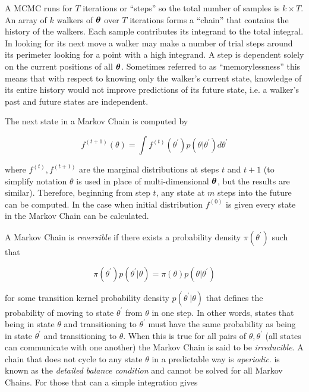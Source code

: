 A MCMC runs for $T$ iterations or ``steps'' so the total number of samples is $k \times T$.    An array of $k$ walkers of
$\boldsymbol{\theta}$ over $T$ iterations forms a ``chain'' that contains the history of the walkers.  Each sample contributes its
integrand to the total integral.  In looking for its next move a walker may make a number of trial steps around its perimeter looking for
a point with a high integrand.  A step is dependent solely on the current positions of all $\boldsymbol{\theta}$.  Sometimes referred to as
``memorylessness'' this means that with respect to knowing only the walker's current state, knowledge of its entire history would not
improve predictions of its future state, i.e. a walker's past and future states are independent.

The next state in a Markov Chain is computed by

\begin{equation}
f^{(t + 1)} (\theta) = \int f^{(t)} (\theta^{\prime}) p(\theta|\theta^{\prime}) d\theta^{\prime}
\label{eq:er_nr_calibrations_parameter_determ_mcmc_marginal}
\end{equation}

\noindent where $f^{(t)}, f^{(t + 1)}$ are the marginal distributions at steps $t$ and $t + 1$ (to simplify notation $\theta$
is used in place of multi-dimensional $\boldsymbol{\theta}$, but the results are similar).  Therefore, beginning from step $t$, any state
at $m$ steps into the future can be computed.  In the case when initial distribution $f^{(0)}$ is given every state in the Markov Chain
can be calculated.

A Markov Chain is \textit{reversible} if there exists a probability density $\pi (\theta^{\prime})$ such that

\begin{equation}
\pi (\theta^{\prime}) p(\theta^{\prime}|\theta) = \pi (\theta) p(\theta|\theta^{\prime})
\label{eq:er_nr_calibrations_parameter_determ_mcmc_detailed_balance}
\end{equation}

\noindent for some transition kernel probability density $p(\theta^{\prime}|\theta)$ that defines the probability of
moving to state $\theta^{\prime}$ from $\theta$ in one step.  In other words, 
 states that being in state $\theta$ and transitioning to
$\theta^{\prime}$ must have the same probability as being in state $\theta^{\prime}$ and transitioning to  $\theta$.  When
this is true for all pairs of $\theta, \theta^{\prime}$ (all states can communicate with one another) the Markov Chain
is said to be \textit{irreducible}.  A chain that does not cycle to any state $\theta$ in a predictable way is
\textit{aperiodic}.  
is known as the \textit{detailed balance condition} and cannot be solved for all Markov Chains.  For those that can a simple integration
gives

